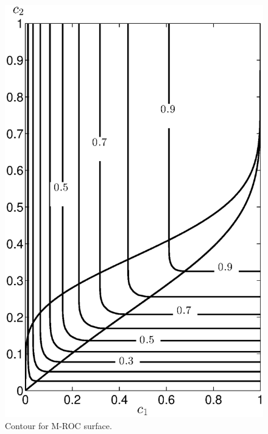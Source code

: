 \documentclass[12pt,journal,a4paper,twoside,doublecolumn]{IEEEtran}
\begin{document}
\begin{spacing}{1.0}
\begin{figure}[!t]
\centering
\includegraphics[width=12cm]{LJcontour.eps}
\caption{Contour for M-ROC surface.}
\label{pic: LJS contour}
\end{figure}



\end{spacing}
\end{document}

